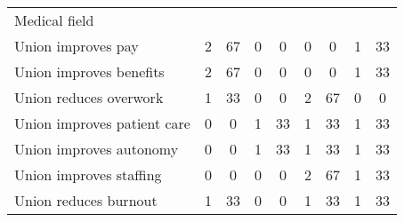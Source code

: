 \begin{tabular}{lcccccccc}\toprule
\cmidrule(lr){2-3} \cmidrule(lr){4-5}
Medical field & \\%
Union improves pay & 2 & 67 & 0 & 0 & 0 & 0 & 1 & 33 \\
Union improves benefits & 2 & 67 & 0 & 0 & 0 & 0 & 1 & 33 \\
Union reduces overwork & 1 & 33 & 0 & 0 & 2 & 67 & 0 & 0 \\
\midrule
Union improves patient care & 0 & 0 & 1 & 33 & 1 & 33 & 1 & 33 \\
Union improves autonomy & 0 & 0 & 1 & 33 & 1 & 33 & 1 & 33 \\
Union improves staffing & 0 & 0 & 0 & 0 & 2 & 67 & 1 & 33 \\
\midrule
Union reduces burnout & 1 & 33 & 0 & 0 & 1 & 33 & 1 & 33 \\
\bottomrule\end{tabular}
